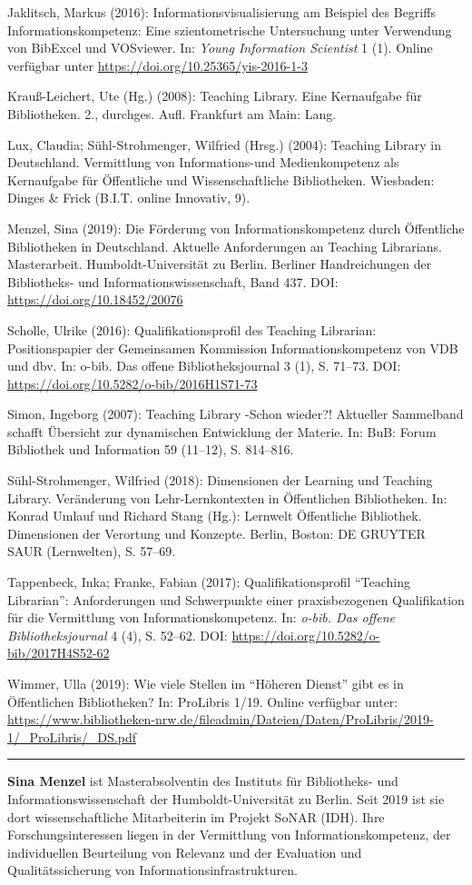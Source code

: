 \documentclass[a4paper,
fontsize=11pt,
oneside,
numbers=noperiodatend,
parskip=half-,
bibliography=totoc,
final
]{scrartcl}
\begin{document}
Jaklitsch, Markus (2016): Informationsvisualisierung am Beispiel des
Begriffs Informationskompetenz: Eine szientometrische Untersuchung unter
Verwendung von BibExcel und VOSviewer. In: \emph{Young Information
Scientist} 1 (1). Online verfügbar unter
\url{https://doi.org/10.25365/yis-2016-1-3}

Krauß-Leichert, Ute (Hg.) (2008): Teaching Library. Eine Kernaufgabe für
Bibliotheken. 2., durchges. Aufl. Frankfurt am Main: Lang.

Lux, Claudia; Sühl-Strohmenger, Wilfried (Hrsg.) (2004): Teaching
Library in Deutschland. Vermittlung von Informations-und Medienkompetenz
als Kernaufgabe für Öffentliche und Wissenschaftliche Bibliotheken.
Wiesbaden: Dinges \& Frick (B.I.T. online Innovativ, 9).

Menzel, Sina (2019): Die Förderung von Informationskompetenz durch
Öffentliche Bibliotheken in Deutschland. Aktuelle Anforderungen an
Teaching Librarians. Masterarbeit. Humboldt-Universität zu Berlin.
Berliner Handreichungen der Bibliotheks- und Informationswissenschaft,
Band 437. DOI: \url{https://doi.org/10.18452/20076}

Scholle, Ulrike (2016): Qualifikationsprofil des Teaching Librarian:
Positionspapier der Gemeinsamen Kommission Informationskompetenz von VDB
und dbv. In: o-bib. Das offene Bibliotheksjournal 3 (1), S. 71--73. DOI:
\url{https://doi.org/10.5282/o-bib/2016H1S71-73}

Simon, Ingeborg (2007): Teaching Library -Schon wieder?! Aktueller
Sammelband schafft Übersicht zur dynamischen Entwicklung der Materie.
In: BuB: Forum Bibliothek und Information 59 (11--12), S. 814--816.

Sühl-Strohmenger, Wilfried (2018): Dimensionen der Learning und Teaching
Library. Veränderung von Lehr-Lernkontexten in Öffentlichen
Bibliotheken. In: Konrad Umlauf und Richard Stang (Hg.): Lernwelt
Öffentliche Bibliothek. Dimensionen der Verortung und Konzepte. Berlin,
Boston: DE GRUYTER SAUR (Lernwelten), S. 57--69.

Tappenbeck, Inka; Franke, Fabian (2017): Qualifikationsprofil
\enquote{Teaching Librarian}: Anforderungen und Schwerpunkte einer
praxisbezogenen Qualifikation für die Vermittlung von
Informationskompetenz. In: \emph{o-bib. Das offene Bibliotheksjournal} 4
(4), S. 52--62. DOI: \url{https://doi.org/10.5282/o-bib/2017H4S52-62}

Wimmer, Ulla (2019): Wie viele Stellen im \enquote{Höheren Dienst} gibt
es in Öffentlichen Bibliotheken? In: ProLibris 1/19. Online verfügbar
unter:
\url{https://www.bibliotheken-nrw.de/fileadmin/Dateien/Daten/ProLibris/2019-1/_ProLibris/_DS.pdf}

\begin{center}\rule{0.5\linewidth}{0.5pt}\end{center}

\textbf{Sina Menzel} ist Masterabsolventin des Instituts für
Bibliotheks- und Informationswissenschaft der Humboldt-Universität zu
Berlin. Seit 2019 ist sie dort wissenschaftliche Mitarbeiterin im
Projekt SoNAR (IDH). Ihre Forschungsinteressen liegen in der Vermittlung
von Informationskompetenz, der individuellen Beurteilung von Relevanz
und der Evaluation und Qualitätssicherung von
Informationsinfrastrukturen.
\end{document}
